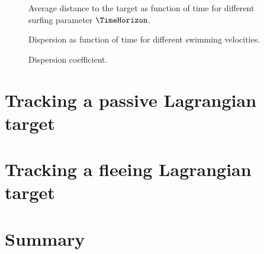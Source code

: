 \begin{figure}%
	\centering
	
	\caption{
		Average distance to the target as function of time for different surfing parameter $\TimeHorizon$.
	}
	\label{fig:surfing_distance}
\end{figure}

\begin{figure}%
	\centering
	
	\caption{
		Dispersion as function of time for different swimming velocities.
	}
	\label{fig:dispersion_swimming_velocity}
\end{figure}

\begin{figure}%
	\centering
	
	\caption{
		Dispersion coefficient.
	}
	\label{fig:dispersion_coefficient}
\end{figure}

\section{Tracking a passive Lagrangian target}

\section{Tracking a fleeing Lagrangian target}

% 

\section{Summary}
